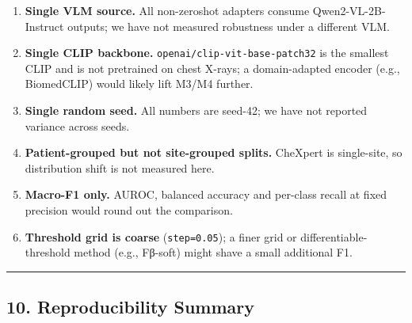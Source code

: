 \documentclass[
  11pt,
]{article}
\providecommand{\tightlist}{%
  \setlength{\itemsep}{0pt}\setlength{\parskip}{0pt}}
\begin{document}
\begin{enumerate}
\def\labelenumi{\arabic{enumi}.}
\tightlist
\item
  \textbf{Single VLM source.} All non-zeroshot adapters consume
  Qwen2-VL-2B-Instruct outputs; we have not measured robustness under a
  different VLM.
\item
  \textbf{Single CLIP backbone.} \texttt{openai/clip-vit-base-patch32}
  is the smallest CLIP and is not pretrained on chest X-rays; a
  domain-adapted encoder (e.g., BiomedCLIP) would likely lift M3/M4
  further.
\item
  \textbf{Single random seed.} All numbers are seed-42; we have not
  reported variance across seeds.
\item
  \textbf{Patient-grouped but not site-grouped splits.} CheXpert is
  single-site, so distribution shift is not measured here.
\item
  \textbf{Macro-F1 only.} AUROC, balanced accuracy and per-class recall
  at fixed precision would round out the comparison.
\item
  \textbf{Threshold grid is coarse} (\texttt{step=0.05}); a finer grid
  or differentiable-threshold method (e.g., Fβ-soft) might shave a small
  additional F1.
\end{enumerate}

\begin{center}\rule{0.5\linewidth}{0.5pt}\end{center}

\subsection{10. Reproducibility Summary}\label{reproducibility-summary}
\end{document}
